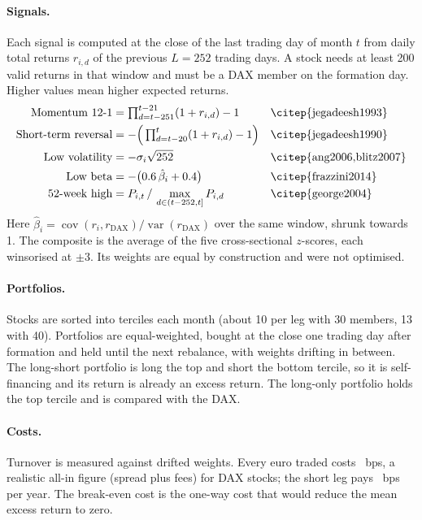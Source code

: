 \documentclass[10pt,a4paper]{article}
\begin{document}
\paragraph{Signals.} Each signal is computed at the close of the last trading day of month $t$ from daily
total returns $r_{i,d}$ of the previous $L=252$ trading days. A stock needs at least 200 valid returns in
that window and must be a DAX member on the formation day. Higher values mean higher expected returns.
\begin{align*}
\text{Momentum 12-1} &= \textstyle\prod_{d=t-251}^{t-21}(1+r_{i,d})-1 &&\text{\citep{jegadeesh1993}}\\
\text{Short-term reversal} &= -\Big(\textstyle\prod_{d=t-20}^{t}(1+r_{i,d})-1\Big) &&\text{\citep{jegadeesh1990}}\\
\text{Low volatility} &= -\sigma_i\sqrt{252} &&\text{\citep{ang2006,blitz2007}}\\
\text{Low beta} &= -\big(0.6\,\hat\beta_i + 0.4\big) &&\text{\citep{frazzini2014}}\\
\text{52-week high} &= P_{i,t}\,/\,\max_{d\in(t-252,t]} P_{i,d} &&\text{\citep{george2004}}
\end{align*}
Here $\hat\beta_i=\operatorname{cov}(r_i,r_{\text{DAX}})/\operatorname{var}(r_{\text{DAX}})$ over the same window, shrunk towards 1. The composite is the average of the five cross-sectional $z$-scores, each winsorised at $\pm3$. Its
weights are equal by construction and were not optimised.

\paragraph{Portfolios.} Stocks are sorted into terciles each month (about 10 per leg with 30 members, 13
with 40). Portfolios are equal-weighted, bought at the close one trading day after formation and held
until the next rebalance, with weights drifting in between. The long-short portfolio is long the top
and short the bottom tercile, so it is self-financing and its return is already an excess return.
The long-only portfolio holds the top tercile and is compared with the DAX.

\paragraph{Costs.} Turnover is measured against drifted weights. Every euro traded costs \CostBps{}~bps,
a realistic all-in figure (spread plus fees) for DAX stocks; the short leg pays \BorrowBps{}~bps per year.
The break-even cost is the one-way cost that would reduce the mean excess return to zero.
\end{document}
